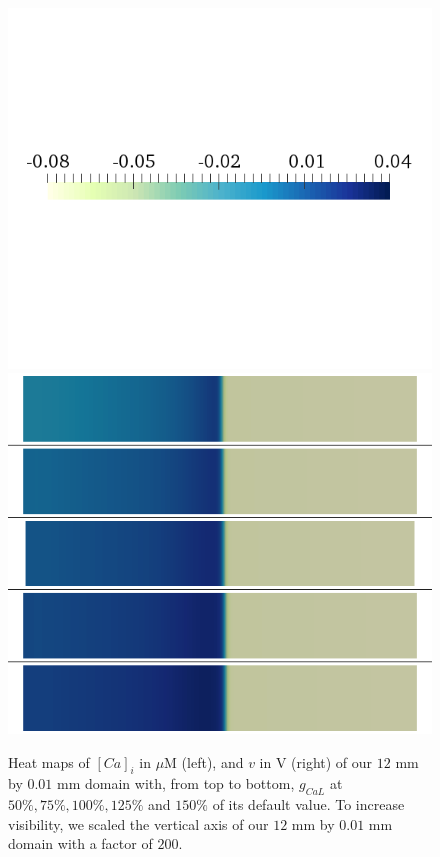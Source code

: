 \documentclass{article}
\begin{document}
\begin{figure}
\begin{minipage}{0.5\textwidth}
\includegraphics[trim=0cm 7cm 0cm 6cm, clip=true, width=1\linewidth]{legend_v2}
\includegraphics[trim=0cm 0cm 0cm 0cm, clip=true, width=1\linewidth]{v_gcal}
    \end{minipage}
    \caption{Heat maps of $[Ca]_i$ in $\mu$M (left), and $v$ in V (right) of our $12$ mm by $0.01$ mm domain with, from top to bottom, $g_{CaL}$ at $50\%, 75\%, 100\%, 125\%$ and $150\%$ of its default value. To increase visibility, we scaled the vertical axis of our $12$ mm by $0.01$ mm domain with a factor of $200$.}
    \label{fig:1b}
\end{figure}
\end{document}
